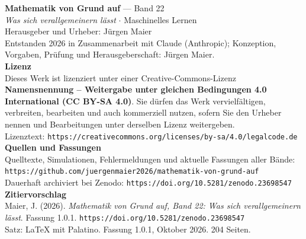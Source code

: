 \thispagestyle{empty}
\vspace*{\fill}
\begin{flushleft}
{\small\color{grau}
\textbf{\color{tief}Mathematik von Grund auf} --- Band 22\\[2pt]
\textit{Was sich verallgemeinern lässt} $\cdot$ Maschinelles Lernen\\[14pt]

Herausgeber und Urheber: Jürgen Maier\\[2pt]
Entstanden 2026 in Zusammenarbeit mit Claude (Anthropic); Konzeption, Vorgaben, Prüfung und Herausgeberschaft: Jürgen Maier.\\[14pt]

\textbf{Lizenz}\\[2pt]
Dieses Werk ist lizenziert unter einer Creative-Commons-Lizenz \textbf{Namensnennung -- Weitergabe unter gleichen Bedingungen 4.0 International (CC BY-SA 4.0)}. Sie dürfen das Werk vervielfältigen, verbreiten, bearbeiten und auch kommerziell nutzen, sofern Sie den Urheber nennen und Bearbeitungen unter derselben Lizenz weitergeben.\\[2pt]
Lizenztext: \texttt{https://creativecommons.org/licenses/by-sa/4.0/legalcode.de}\\[14pt]

\textbf{Quellen und Fassungen}\\[2pt]
Quelltexte, Simulationen, Fehlermeldungen und aktuelle Fassungen aller Bände:\\
\texttt{https://github.com/juergenmaier2026/mathematik-von-grund-auf}\\[2pt]
Dauerhaft archiviert bei Zenodo: \texttt{https://doi.org/10.5281/zenodo.23698547}\\[14pt]

\textbf{Zitiervorschlag}\\[2pt]
Maier, J. (2026). \textit{Mathematik von Grund auf, Band 22: Was sich verallgemeinern lässt}. Fassung 1.0.1. \texttt{https://doi.org/10.5281/zenodo.23698547}\\[14pt]

Satz: \LaTeX{} mit Palatino. Fassung 1.0.1, Oktober 2026. 204 Seiten.
}
\end{flushleft}
\vspace*{1.5cm}
